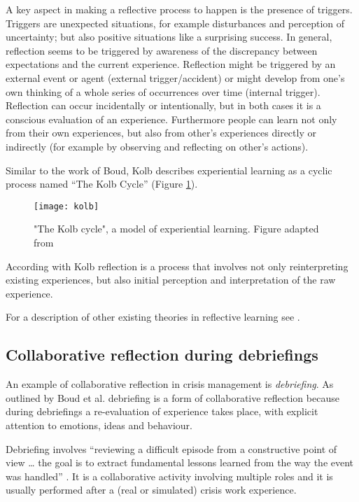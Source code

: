 A key aspect in making a reflective process to happen is the presence of triggers. Triggers are unexpected situations, for example disturbances and perception of uncertainty; but also positive situations like a surprising success. In general, reflection seems to be triggered by awareness of the discrepancy between expectations and the current experience. Reflection might be triggered by an external event or agent (external trigger/accident) or might develop from one's own thinking of a whole series of occurrences over time (internal trigger). Reflection can occur incidentally or intentionally, but in both cases it is a conscious evaluation of an experience. Furthermore people can learn not only from their own experiences, but also from other's experiences directly or indirectly (for example by observing and reflecting on other's actions).

Similar to the work of Boud, Kolb describes experiential learning as a cyclic process named ``The Kolb Cycle'' (Figure \ref{fig:kolb-model}).

\begin{figure}
	[tbh] \centering 
	\texttt{[image: kolb]} \caption{"The Kolb cycle", a model of experiential learning. Figure adapted from \protect\autocite{kolb1984organizational}} \label{fig:kolb-model} 
\end{figure}

According with Kolb \autocite*{kolb1984experiential} reflection is a process that involves not only reinterpreting existing experiences, but also initial perception and interpretation of the raw experience.

For a description of other existing theories in reflective learning see \autocite{WoodDaudelin199636}.

\subsection{Collaborative reflection during debriefings}\label{debriefing-crisis-management-work-an-example-of-collaborative-reflection}

An example of collaborative reflection in crisis management is \emph{debriefing}. As outlined by Boud et al. \autocite*{boud1985reflection} debriefing is a form of collaborative reflection because during debriefings a re-evaluation of experience takes place, with explicit attention to emotions, ideas and behaviour.

Debriefing involves ``reviewing a difficult episode from a constructive point of view \ldots{} the goal is to extract fundamental lessons learned from the way the event was handled'' \autocite{Lagadec:1997js}. It is a collaborative activity involving multiple roles and it is usually performed after a (real or simulated) crisis work experience. 

